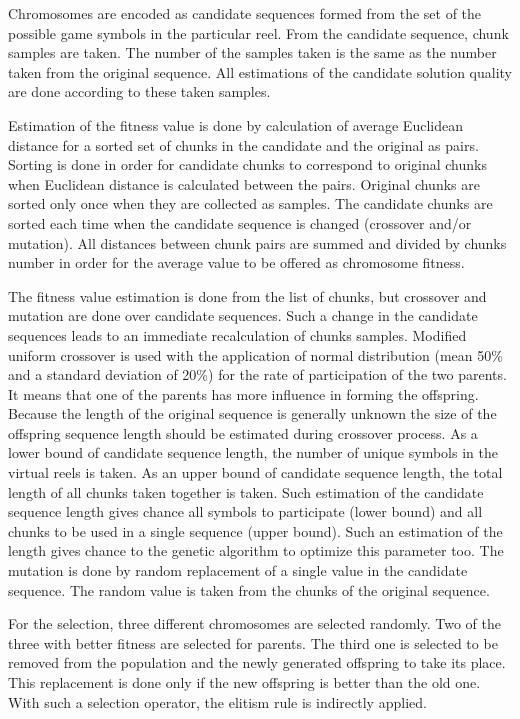 \documentclass[11pt]{article}
\begin{document}
Chromosomes are encoded as candidate sequences formed from the set of the possible game symbols in the particular reel. From the candidate sequence, chunk samples are taken. The number of the samples taken is the same as the number taken from the original sequence. All estimations of the candidate solution quality are done according to these taken samples. 

Estimation of the fitness value is done by calculation of average Euclidean distance for a sorted set of chunks in the candidate and the original as pairs. Sorting is done in order for candidate chunks to correspond to original chunks when Euclidean distance is calculated between the pairs. Original chunks are sorted only once when they are collected as samples. The candidate chunks are sorted each time when the candidate sequence is changed (crossover and/or mutation). All distances between chunk pairs are summed and divided by chunks number in order for the average value to be offered as chromosome fitness. 

The fitness value estimation is done from the list of chunks, but crossover and mutation are done over candidate sequences. Such a change in the candidate sequences leads to an immediate recalculation of chunks samples. Modified uniform crossover is used with the application of normal distribution (mean 50\% and a standard deviation of 20\%) for the rate of participation of the two parents. It means that one of the parents has more influence in forming the offspring. Because the length of the original sequence is generally unknown the size of the offspring sequence length should be estimated during crossover process. As a lower bound of candidate sequence length, the number of unique symbols in the virtual reels is taken. As an upper bound of candidate sequence length, the total length of all chunks taken together is taken. Such estimation of the candidate sequence length gives chance all symbols to participate (lower bound) and all chunks to be used in a single sequence (upper bound). Such an estimation of the length gives chance to the genetic algorithm to optimize this parameter too. The mutation is done by random replacement of a single value in the candidate sequence. The random value is taken from the chunks of the original sequence. 

For the selection, three different chromosomes are selected randomly. Two of the three with better fitness are selected for parents. The third one is selected to be removed from the population and the newly generated offspring to take its place. This replacement is done only if the new offspring is better than the old one. With such a selection operator, the elitism rule is indirectly applied.
\end{document}
